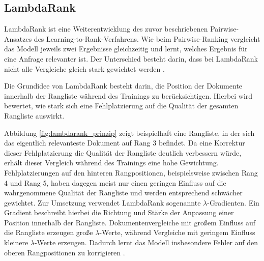 \subsection{LambdaRank}
\label{sec:lambdarank}


LambdaRank ist eine Weiterentwicklung des zuvor beschriebenen Pairwise-Ansatzes des Learning-to-Rank-Verfahrens.
Wie beim Pairwise-Ranking vergleicht das Modell jeweils zwei Ergebnisse gleichzeitig und lernt, welches Ergebnis für eine Anfrage relevanter ist. 
Der Unterschied besteht darin, dass bei LambdaRank nicht alle Vergleiche gleich stark gewichtet werden \parencite{Burges2006LambdaRank}.

Die Grundidee von LambdaRank besteht darin, die Position der Dokumente innerhalb der Rangliste während des Trainings zu berücksichtigen. 
Hierbei wird bewertet, wie stark sich eine Fehlplatzierung auf die Qualität der gesamten Rangliste auswirkt. 

Abbildung \ref{fig:lambdarank_prinzip} zeigt beispielhaft eine Rangliste, in der sich das eigentlich relevanteste Dokument auf Rang 3 befindet. 
Da eine Korrektur dieser Fehlplatzierung die Qualität der Rangliste deutlich verbessern würde, erhält dieser Vergleich während des Trainings eine hohe Gewichtung. 
Fehlplatzierungen auf den hinteren Rangpositionen, beispielsweise zwischen Rang 4 und Rang 5, haben dagegen meist nur einen geringen Einfluss auf die wahrgenommene Qualität der Rangliste und werden entsprechend schwächer gewichtet. 
Zur Umsetzung verwendet LambdaRank sogenannte $\lambda$-Gradienten. Ein Gradient beschreibt hierbei die Richtung und Stärke der Anpassung einer Position innerhalb der Rangliste. Dokumentenvergleiche mit großem Einfluss auf die Rangliste erzeugen große $\lambda$-Werte, während Vergleiche mit geringem Einfluss kleinere $\lambda$-Werte erzeugen. 
Dadurch lernt das Modell insbesondere Fehler auf den oberen Rangpositionen zu korrigieren \parencite{Burges2006LambdaRank}.

